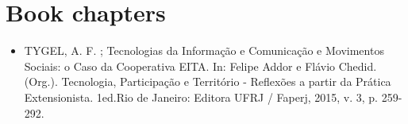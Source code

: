 \section{Book chapters}
\begin{itemize}
\item TYGEL, A. F. ; Tecnologias da Informação e Comunicação e Movimentos Sociais: o Caso da Cooperativa EITA. In: Felipe Addor e Flávio Chedid. (Org.). Tecnologia, Participação e Território - Reflexões a partir da Prática Extensionista. 1ed.Rio de Janeiro: Editora UFRJ / Faperj, 2015, v. 3, p. 259-292.
\end{itemize}


